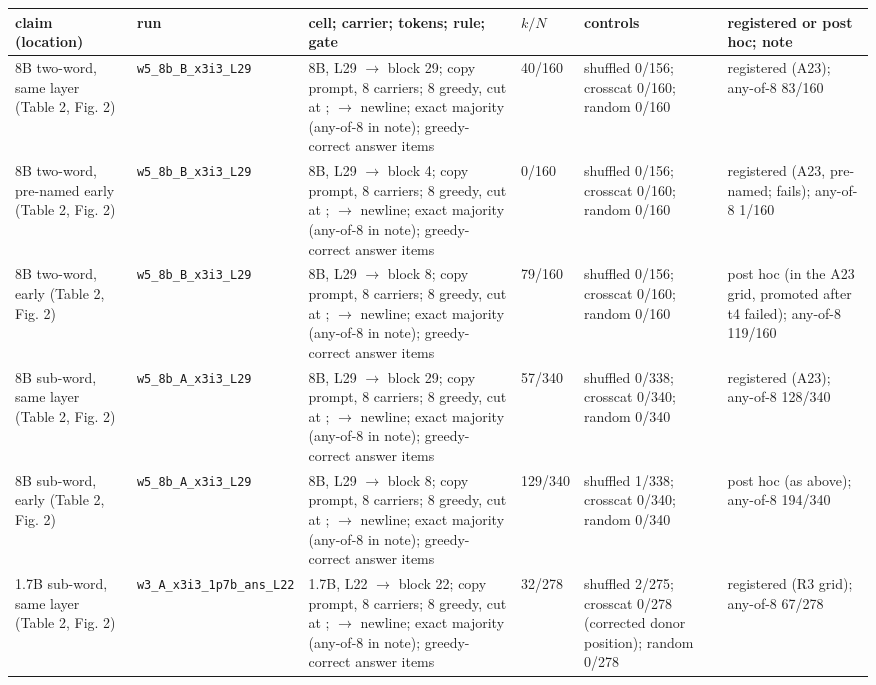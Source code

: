 \begin{table}[t]
\centering
\small
\setlength{\tabcolsep}{1mm}
\begin{tabular}{@{}p{2.5cm}p{2.3cm}p{4.5cm}p{1.3cm}p{3.0cm}p{2.9cm}@{}}
\toprule
claim (location) & run & cell; carrier; tokens; rule; gate & $k/N$ & controls & registered or post hoc; note \\
\midrule
8B two-word, same layer (Table 2, Fig. 2) & \texttt{w5\_\allowbreak{{}}8b\_\allowbreak{{}}B\_\allowbreak{{}}x3i3\_\allowbreak{{}}L29} & 8B, L29 $\to$ block 29; copy prompt, 8 carriers; 8 greedy, cut at ; $\to$ newline; exact majority (any-of-8 in note); greedy-correct answer items & 40/160 & shuffled 0/156; crosscat 0/160; random 0/160 & registered (A23); any-of-8 83/160 \\
8B two-word, pre-named early (Table 2, Fig. 2) & \texttt{w5\_\allowbreak{{}}8b\_\allowbreak{{}}B\_\allowbreak{{}}x3i3\_\allowbreak{{}}L29} & 8B, L29 $\to$ block 4; copy prompt, 8 carriers; 8 greedy, cut at ; $\to$ newline; exact majority (any-of-8 in note); greedy-correct answer items & 0/160 & shuffled 0/156; crosscat 0/160; random 0/160 & registered (A23, pre-named; fails); any-of-8 1/160 \\
8B two-word, early (Table 2, Fig. 2) & \texttt{w5\_\allowbreak{{}}8b\_\allowbreak{{}}B\_\allowbreak{{}}x3i3\_\allowbreak{{}}L29} & 8B, L29 $\to$ block 8; copy prompt, 8 carriers; 8 greedy, cut at ; $\to$ newline; exact majority (any-of-8 in note); greedy-correct answer items & 79/160 & shuffled 0/156; crosscat 0/160; random 0/160 & post hoc (in the A23 grid, promoted after t4 failed); any-of-8 119/160 \\
8B sub-word, same layer (Table 2, Fig. 2) & \texttt{w5\_\allowbreak{{}}8b\_\allowbreak{{}}A\_\allowbreak{{}}x3i3\_\allowbreak{{}}L29} & 8B, L29 $\to$ block 29; copy prompt, 8 carriers; 8 greedy, cut at ; $\to$ newline; exact majority (any-of-8 in note); greedy-correct answer items & 57/340 & shuffled 0/338; crosscat 0/340; random 0/340 & registered (A23); any-of-8 128/340 \\
8B sub-word, early (Table 2, Fig. 2) & \texttt{w5\_\allowbreak{{}}8b\_\allowbreak{{}}A\_\allowbreak{{}}x3i3\_\allowbreak{{}}L29} & 8B, L29 $\to$ block 8; copy prompt, 8 carriers; 8 greedy, cut at ; $\to$ newline; exact majority (any-of-8 in note); greedy-correct answer items & 129/340 & shuffled 1/338; crosscat 0/340; random 0/340 & post hoc (as above); any-of-8 194/340 \\
1.7B sub-word, same layer (Table 2, Fig. 2) & \texttt{w3\_\allowbreak{{}}A\_\allowbreak{{}}x3i3\_\allowbreak{{}}1p7b\_\allowbreak{{}}ans\_\allowbreak{{}}L22} & 1.7B, L22 $\to$ block 22; copy prompt, 8 carriers; 8 greedy, cut at ; $\to$ newline; exact majority (any-of-8 in note); greedy-correct answer items & 32/278 & shuffled 2/275; crosscat 0/278 (corrected donor position); random 0/278 & registered (R3 grid); any-of-8 67/278 \\

\end{tabular}
\end{table}
